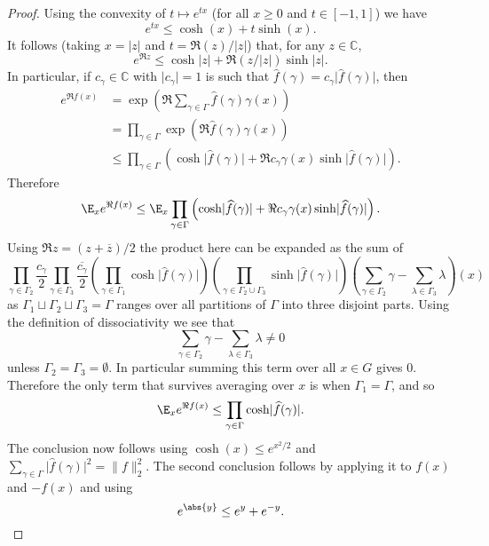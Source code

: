 \begin{proof}
\leanok
Using the convexity of $t\mapsto e^{tx}$ (for all $x\geq 0$ and $t\in[-1,1]$) we have
\[e^{tx}\le \cosh(x)+t\sinh(x).\]
It follows (taking $x=\lvert z\rvert$ and $t=\Re(z)/\lvert z\rvert$) that, for any $z\in \mathbb{C}$,
\[e^{\Re z}\le \cosh \lvert z\rvert +\Re(z/\lvert z\rvert)\sinh \lvert z\rvert.\]
In particular, if $c_\gamma\in \mathbb{C}$ with $\lvert c_\gamma\rvert=1$ is such that $\widehat{f}(\gamma)=c_\gamma\lvert \widehat{f}(\gamma)\rvert$, then
\begin{align*}
e^{\Re f(x)}
&= \exp\left( \Re \sum_{\gamma\in\Gamma}\widehat{f}(\gamma)\gamma(x)\right)\\
&=\prod_{\gamma\in \Gamma} \exp\left( \Re \widehat{f}(\gamma)\gamma(x)\right)\\
&\le \prod_{\gamma\in \Gamma}\left( \cosh \lvert \widehat{f}(\gamma)\rvert +\Re c_\gamma \gamma(x)\sinh \lvert \widehat{f}(\gamma)\rvert\right).
\end{align*}
Therefore
\[\E_x e^{\Re f(x)}\le \E_x \prod_{\gamma\in \Gamma} \left( \cosh\lvert \widehat{f}(\gamma)\rvert+\Re c_\gamma \gamma(x)\sinh\lvert \widehat{f}(\gamma)\rvert\right).\]
Using $\Re z=(z+\overline{z})/2$ the product here can be expanded as the sum of
\[\prod_{\gamma\in \Gamma_2}\frac{c_\gamma}{2}\prod_{\gamma\in \Gamma_3}\frac{\overline{c_\gamma}}{2}\left(\prod_{\gamma\in \Gamma_1}\cosh\lvert \widehat{f}(\gamma)\rvert\right)\left(\prod_{\gamma\in \Gamma_2\cup\Gamma_3}\sinh\lvert \widehat{f}(\gamma)\rvert\right)\left(\sum_{\gamma\in \Gamma_2}\gamma-\sum_{\lambda\in \Gamma_3}\lambda\right)(x)\]
as $\Gamma_1\sqcup \Gamma_2\sqcup \Gamma_3=\Gamma$ ranges over all partitions of $\Gamma$ into three disjoint parts. Using the definition of dissociativity we see that
\[\sum_{\gamma\in \Gamma_2}\gamma-\sum_{\lambda\in \Gamma_3}\lambda\neq 0\]
unless $\Gamma_2=\Gamma_3=\emptyset$. In particular summing this term over all $x\in G$ gives $0$. Therefore the only term that survives averaging over $x$ is when $\Gamma_1=\Gamma$, and so
\[\E_x e^{\Re f(x)}\le \prod_{\gamma\in \Gamma} \cosh \lvert \widehat{f}(\gamma)\rvert.\]
The conclusion now follows using $\cosh(x) \le e^{x^2/2}$ and $\sum_{\gamma\in \Gamma}\lvert \widehat{f}(\gamma)\rvert^2=\| f\|_2^2$. The second conclusion follows by applying it to $f(x)$ and $-f(x)$ and using
\[e^{\abs{y}}\le e^y+e^{-y}.\]
\end{proof}


